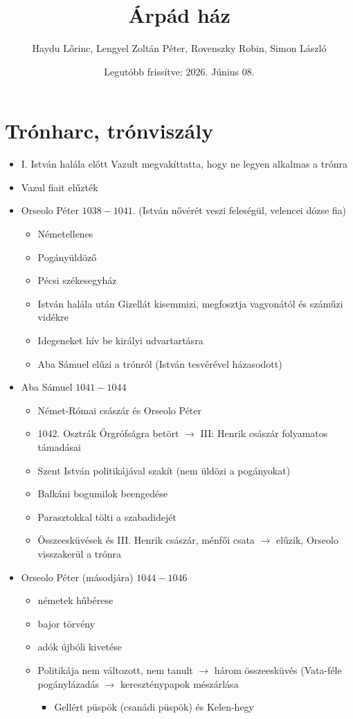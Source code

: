 \documentclass{article}
\title{Árpád ház}
\author{Haydu Lőrinc, Lengyel Zoltán Péter, Rovenszky Robin, Simon László}
\date{Legutóbb frissítve: 2026. Június 08.}
\begin{document}
\maketitle
\tableofcontents

\section{Trónharc, trónviszály}
\begin{itemize}
    \item I. István halála előtt Vazult megvakíttatta, hogy ne legyen alkalmas a trónra
    \item Vazul fiait elűzték
    \item Orseolo Péter $1038-1041$. (István nővérét veszi feleségül, velencei dózse fia) 
    \begin{itemize}
        \item Németellenes
        \item Pogányüldöző
        \item Pécsi székesegyház
        \item István halála után Gizellát kisemmizi, megfosztja vagyonától és száműzi vidékre
        \item Idegeneket hív be királyi udvartartásra
        \item Aba Sámuel elűzi a trónról (István tesvérével házasodott)
    \end{itemize}
        
    \item Aba Sámuel $1041-1044$
    \begin{itemize}
        \item Német-Római császár és Orseolo Péter
        \item 1042. Osztrák Őrgrófságra betört $\rightarrow$ III: Henrik császár folyamatos támadásai
        \item Szent István politikájával szakít (nem üldözi a pogányokat)
        \item Balkáni bogumilok beengedése
        \item Parasztokkal tölti a szabadidejét
        \item Összeesküvések és III. Henrik császár, ménfői csata $\rightarrow$ elűzik, Orseolo visszakerül a trónra
    \end{itemize}
    
    \item Orseolo Péter (másodjára) $1044-1046$
    \begin{itemize}
        \item németek hűbérese
        \item bajor törvény 
        \item adók újbóli kivetése
        \item Politikája nem változott, nem tanult $\rightarrow$ három összeesküvés (Vata-féle pogánylázadás $\rightarrow$ kereszténypapok mészárlása 
        \begin{itemize}
            \item Gellért püspök (csanádi püspök) és Kelen-hegy
        \end{itemize}
        

\end{itemize}
\end{itemize}
\end{document}
